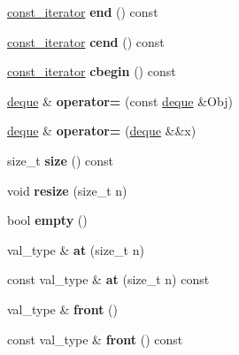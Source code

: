 \begin{DoxyCompactItemize}
\hyperlink{structdeque__iterator}{const\+\_\+iterator} {\bfseries end} () const
\item 
\hypertarget{classdeque_a1791c707b5e84de39339d81c80765f58}{}\label{classdeque_a1791c707b5e84de39339d81c80765f58} 
\hyperlink{structdeque__iterator}{const\+\_\+iterator} {\bfseries cend} () const
\item 
\hypertarget{classdeque_aff9557600015f16555ae8997ca2e0ed3}{}\label{classdeque_aff9557600015f16555ae8997ca2e0ed3} 
\hyperlink{structdeque__iterator}{const\+\_\+iterator} {\bfseries cbegin} () const
\item 
\hypertarget{classdeque_ade2072ef11e762044cb3157df1932751}{}\label{classdeque_ade2072ef11e762044cb3157df1932751} 
\hyperlink{classdeque}{deque} \& {\bfseries operator=} (const \hyperlink{classdeque}{deque} \&Obj)
\item 
\hypertarget{classdeque_aa6e3f78f8aa043f605b1b723af3ff3de}{}\label{classdeque_aa6e3f78f8aa043f605b1b723af3ff3de} 
\hyperlink{classdeque}{deque} \& {\bfseries operator=} (\hyperlink{classdeque}{deque} \&\&x)
\item 
\hypertarget{classdeque_a5cedf7c96add3dbdada01afb3d1a6106}{}\label{classdeque_a5cedf7c96add3dbdada01afb3d1a6106} 
size\+\_\+t {\bfseries size} () const
\item 
\hypertarget{classdeque_aab87563431ccaaf0502d036c895294aa}{}\label{classdeque_aab87563431ccaaf0502d036c895294aa} 
void {\bfseries resize} (size\+\_\+t n)
\item 
\hypertarget{classdeque_a3c50a0c308fa95d7ebc7b6f8a7b51834}{}\label{classdeque_a3c50a0c308fa95d7ebc7b6f8a7b51834} 
bool {\bfseries empty} ()
\item 
\hypertarget{classdeque_a1e8f01b43e7d197742a1afbd758ef90d}{}\label{classdeque_a1e8f01b43e7d197742a1afbd758ef90d} 
val\+\_\+type \& {\bfseries at} (size\+\_\+t n)
\item 
\hypertarget{classdeque_ad802f6c828533e0c37dbda15d55d2c64}{}\label{classdeque_ad802f6c828533e0c37dbda15d55d2c64} 
const val\+\_\+type \& {\bfseries at} (size\+\_\+t n) const
\item 
\hypertarget{classdeque_aedc550f2b294e23a54ca35362c336c67}{}\label{classdeque_aedc550f2b294e23a54ca35362c336c67} 
val\+\_\+type \& {\bfseries front} ()
\item 
\hypertarget{classdeque_af23d9179c1f8d868de051b594d15eeca}{}\label{classdeque_af23d9179c1f8d868de051b594d15eeca} 
const val\+\_\+type \& {\bfseries front} () const
\item 
\hypertarget{classdeque_a54b65ee808502e4b1097fdb679da245c}{}\label{classdeque_a54b65ee808502e4b1097fdb679da245c} 

\end{DoxyCompactItemize}
